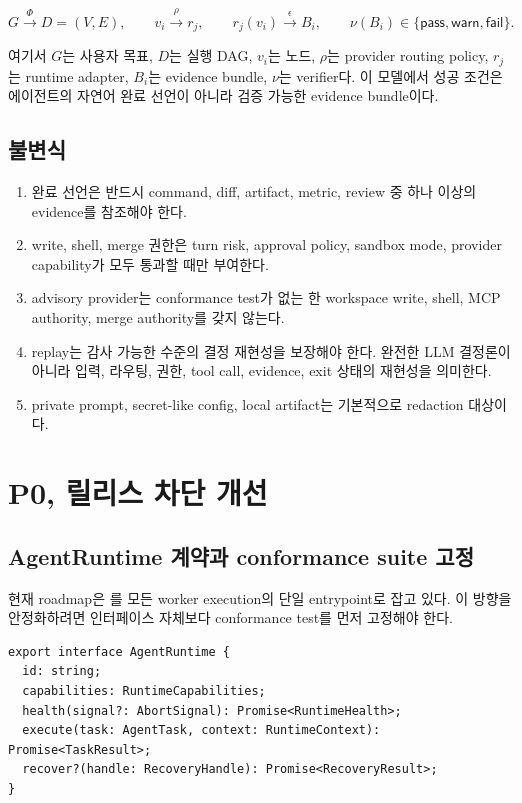 \documentclass[11pt,a4paper]{article}
\newcommand{\code}[1]{\texttt{\detokenize{#1}}}
\begin{document}
\[
G \xrightarrow{\Phi} D=(V,E),\qquad
v_i \xrightarrow{\rho} r_j,\qquad
r_j(v_i) \xrightarrow{\epsilon} B_i,\qquad
\nu(B_i) \in \{\textsf{pass},\textsf{warn},\textsf{fail}\}.
\]

여기서 $G$는 사용자 목표, $D$는 실행 DAG, $v_i$는 노드, $\rho$는 provider routing policy, $r_j$는 runtime adapter, $B_i$는 evidence bundle, $\nu$는 verifier다. 이 모델에서 성공 조건은 에이전트의 자연어 완료 선언이 아니라 검증 가능한 evidence bundle이다.

\subsection{불변식}
\begin{enumerate}
  \item 완료 선언은 반드시 command, diff, artifact, metric, review 중 하나 이상의 evidence를 참조해야 한다.
  \item write, shell, merge 권한은 turn risk, approval policy, sandbox mode, provider capability가 모두 통과할 때만 부여한다.
  \item advisory provider는 conformance test가 없는 한 workspace write, shell, MCP authority, merge authority를 갖지 않는다.
  \item replay는 감사 가능한 수준의 결정 재현성을 보장해야 한다. 완전한 LLM 결정론이 아니라 입력, 라우팅, 권한, tool call, evidence, exit 상태의 재현성을 의미한다.
  \item private prompt, secret-like config, local artifact는 기본적으로 redaction 대상이다.
\end{enumerate}

\section{P0, 릴리스 차단 개선}
\subsection{AgentRuntime 계약과 conformance suite 고정}
현재 roadmap은 \code{AgentRuntime.execute}를 모든 worker execution의 단일 entrypoint로 잡고 있다. 이 방향을 안정화하려면 인터페이스 자체보다 conformance test를 먼저 고정해야 한다.

\begin{verbatim}
export interface AgentRuntime {
  id: string;
  capabilities: RuntimeCapabilities;
  health(signal?: AbortSignal): Promise<RuntimeHealth>;
  execute(task: AgentTask, context: RuntimeContext): Promise<TaskResult>;
  recover?(handle: RecoveryHandle): Promise<RecoveryResult>;
}
\end{verbatim}
\end{document}
